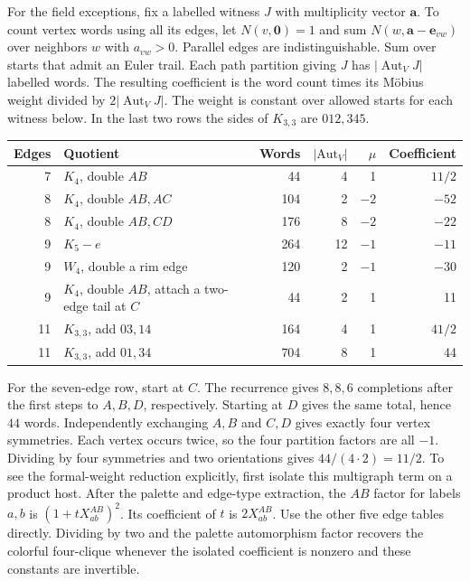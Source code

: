 \documentclass[11pt,letterpaper]{article}
\begin{document}
For the field exceptions, fix a labelled witness \(J\) with multiplicity vector \(\mathbf a\). To count vertex words using all its edges, let \(N(v,\mathbf 0)=1\) and sum \(N(w,\mathbf a-\mathbf e_{vw})\) over neighbors \(w\) with \(a_{vw}>0\). Parallel edges are indistinguishable. Sum over starts that admit an Euler trail. Each path partition giving \(J\) has \(|\operatorname{Aut}_V J|\) labelled words. The resulting coefficient is the word count times its Möbius weight divided by \(2|\operatorname{Aut}_V J|\). The weight is constant over allowed starts for each witness below. In the last two rows the sides of \(K_{3,3}\) are \(012,345\).

\begin{center}
\small
\begin{tabularx}{\linewidth}{@{}rXrrrr@{}}
\toprule
Edges & Quotient & Words & $|\mathrm{Aut}_V|$ & $\mu$ & Coefficient \\
\midrule
7 & \(K_4\), double \(AB\) & 44 & 4 & 1 & \(11/2\) \\
8 & \(K_4\), double \(AB,AC\) & 104 & 2 & \(-2\) & \(-52\) \\
8 & \(K_4\), double \(AB,CD\) & 176 & 8 & \(-2\) & \(-22\) \\
9 & \(K_5-e\) & 264 & 12 & \(-1\) & \(-11\) \\
9 & \(W_4\), double a rim edge & 120 & 2 & \(-1\) & \(-30\) \\
9 & \(K_4\), double \(AB\), attach a two-edge tail at \(C\) & 44 & 2 & 1 & 11 \\
11 & \(K_{3,3}\), add \(03,14\) & 164 & 4 & 1 & \(41/2\) \\
11 & \(K_{3,3}\), add \(01,34\) & 704 & 8 & 1 & 44 \\
\bottomrule
\end{tabularx}
\end{center}

For the seven-edge row, start at \(C\). The recurrence gives \(8,8,6\) completions after the first steps to \(A,B,D\), respectively. Starting at \(D\) gives the same total, hence \(44\) words. Independently exchanging \(A,B\) and \(C,D\) gives exactly four vertex symmetries. Each vertex occurs twice, so the four partition factors are all \(-1\). Dividing by four symmetries and two orientations gives \(44/(4\cdot2)=11/2\). To see the formal-weight reduction explicitly, first isolate this multigraph term on a product host. After the palette and edge-type extraction, the \(AB\) factor for labels \(a,b\) is \((1+tX^{AB}_{ab})^2\). Its coefficient of \(t\) is \(2X^{AB}_{ab}\). Use the other five edge tables directly. Dividing by two and the palette automorphism factor recovers the colorful four-clique whenever the isolated coefficient is nonzero and these constants are invertible.
\end{document}
